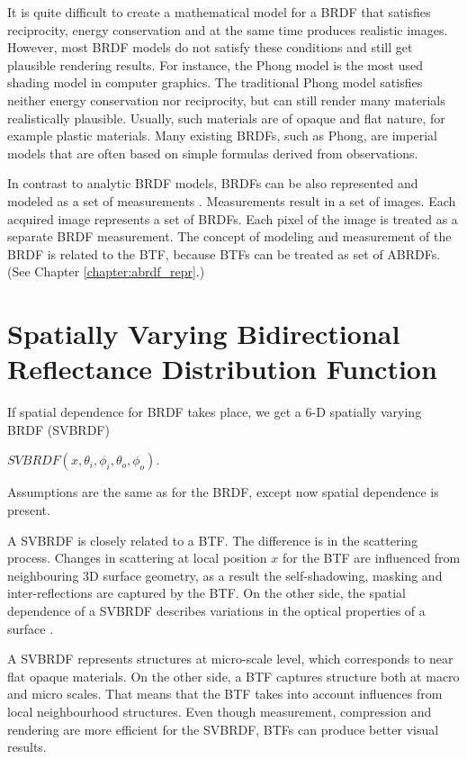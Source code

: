 It is quite difficult to create a mathematical model for a BRDF that satisfies reciprocity,
energy conservation and at the same time produces realistic images.
 However, most BRDF models do not satisfy these conditions and still get plausible rendering results.
For instance, the Phong model \cite{Phong} is the most used shading model in computer graphics. 
The traditional Phong model satisfies neither energy conservation nor reciprocity, but can still render many materials realistically plausible.
Usually, such materials are of opaque and flat nature, for example plastic materials.
Many existing BRDFs, such as Phong, are imperial models that are often based on simple formulas derived from observations. 

In contrast to analytic BRDF models, BRDFs can be also represented and modeled as a set of measurements \cite{MatusikPBM03}.
Measurements result in a set of images. Each acquired image represents a set of BRDFs.
Each pixel of the image is treated as a separate BRDF measurement.
The concept of modeling and measurement of the BRDF is related to the BTF, because BTFs can be treated as set of ABRDFs. (See Chapter \ref{chapter:abrdf_repr}.)


\section{Spatially Varying Bidirectional Reflectance Distribution Function}
\label{section:svbrdf}
If spatial dependence for BRDF takes place, we get a 6-D spatially varying BRDF (SVBRDF)


 \begin{center}
$SVBRDF(x,\theta_{i} ,\phi_{i},\theta_{o} ,\phi_{o})$.
 \end{center}
 Assumptions are the same as for the BRDF, except now spatial dependence is present.
 
A SVBRDF is closely related to a BTF. The difference is in the scattering process. 
Changes in scattering at local position $x$ for the BTF are influenced from neighbouring 3D surface geometry, as a result the self-shadowing, masking and inter-reflections are captured by the BTF.
On the other side, the spatial dependence of a SVBRDF describes variations in the optical properties of a surface \cite{haindl_visual}.


 
A SVBRDF represents structures at micro-scale level, which corresponds to near flat opaque materials. On the other side, a BTF captures structure both at macro and micro scales.
 That means that the BTF takes into account influences from local neighbourhood structures. Even though measurement, compression and rendering are more efficient for the SVBRDF, 
  BTFs can produce better visual results. \cite{haindl_visual}
 
